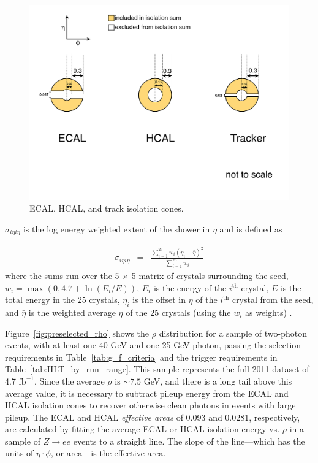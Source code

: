\documentclass[dissertation.tex]{subfiles}
\begin{document}
\begin{figure}
	\centering
	\includegraphics[scale=0.4]{isolation_cones}
	\caption{ECAL, HCAL, and track isolation cones.}
	\label{fig:isolation_cones}
\end{figure}

$\sigma_{i\eta i\eta}$ is the log energy weighted extent of the shower in $\eta$ and is defined as

\begin{eqnarray}
\sigma_{i\eta i\eta} &=& \frac{\sum_{i = 1}^{25}w_{i}(\eta_{i} - \bar{\eta})^{2}}{\sum_{i = 1}^{25}w_{i}}
\end{eqnarray}
%
where the sums run over the 5 $\times$ 5 matrix of crystals surrounding the seed, $w_{i} = \max(0, 4.7 + \ln(E_{i}/E))$, $E_{i}$ is the energy of the $i^{\mathrm{th}}$ crystal, $E$ is the total energy in the 25 crystals, $\eta_{i}$ is the offset in $\eta$ of the $i^{\mathrm{th}}$ crystal from the seed, and $\bar{\eta}$ is the weighted average $\eta$ of the 25 crystals (using the $w_{i}$ as weights) \cite{PhysRevLett.106.082001}.

Figure~\ref{fig:preselected_rho} shows the $\rho$ distribution for a sample of two-photon events, with at least one 40 GeV and one 25 GeV photon, passing the selection requirements in Table~\ref{tab:g_f_criteria} and the trigger requirements in Table~\ref{tab:HLT_by_run_range}.  This sample represents the full 2011 dataset of 4.7 $\mbox{fb}^{-1}$.  Since the average $\rho$ is $\sim 7.5$ GeV, and there is a long tail above this average value, it is necessary to subtract pileup energy from the ECAL and HCAL isolation cones to recover otherwise clean photons in events with large pileup.  The ECAL and HCAL \textit{effective areas} of 0.093 and 0.0281, respectively, are calculated by fitting the average ECAL or HCAL isolation energy vs. $\rho$ in a sample of $Z\rightarrow ee$ events to a straight line.  The slope of the line---which has the units of $\eta\cdot\phi$, or area---is the effective area.
\end{document}
